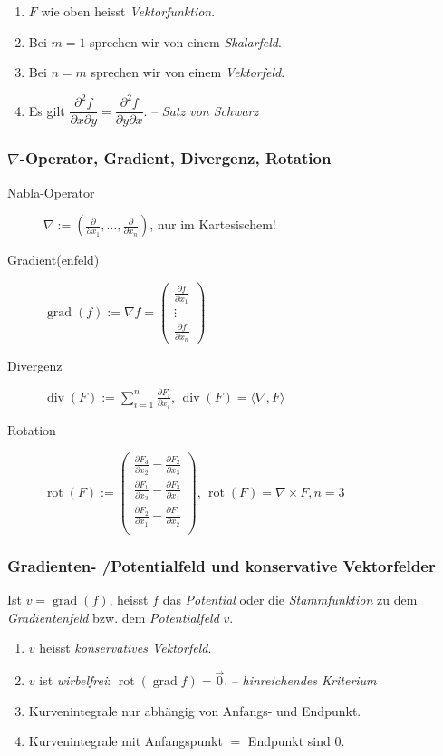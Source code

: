 \documentclass[a4paper, 9pt, DIV=24]{scrartcl}
\DeclareMathOperator{\grad}{grad}
\DeclareMathOperator{\rot}{rot}
\DeclareMathOperator{\Div}{div}
\begin{document}
\begin{enumerate}[label={(}\arabic*{)}]
 \item $F$ wie oben heisst \emph{Vektorfunktion}.
 \item Bei $m = 1$ sprechen wir von einem \emph{Skalarfeld}.
 \item Bei $n = m$ sprechen wir von einem \emph{Vektorfeld}.
 \item Es gilt $\dfrac{\partial^2 f}{\partial x\partial y} = \dfrac{\partial^2 f}{\partial y\partial x}$. -- \emph{Satz von Schwarz}
\end{enumerate}

\subsubsection{$\nabla$-Operator, Gradient, Divergenz, Rotation}
\begin{description}
 \item[Nabla-Operator] $\nabla := (\frac{\partial}{\partial x_1},\dots,\frac{\partial}{\partial x_n})$, nur im Kartesischem!
 \item[Gradient(enfeld)] $\grad(f) := \nabla f = \begin{pmatrix}\frac{\partial f}{\partial x_1} \\\vdots\\ \frac{\partial f}{\partial x_n}\end{pmatrix}$
 \item[Divergenz] $\Div(F) := \sum_{i=1}^n\frac{\partial F_i}{\partial x_i},\, \Div(F) = \langle \nabla, F \rangle$
 \item[Rotation] $\rot(F) := \begin{pmatrix}
\frac{\partial F_3}{\partial x_2} - \frac{\partial F_2}{\partial x_3} \\
\frac{\partial F_1}{\partial x_3} - \frac{\partial F_3}{\partial x_1} \\
\frac{\partial F_2}{\partial x_1} - \frac{\partial F_1}{\partial x_2} \\
\end{pmatrix},\, \rot(F) = \nabla \times F, n = 3$
\end{description}

\subsubsection{Gradienten- /Potentialfeld und konservative Vektorfelder}
Ist $v = \grad(f)$, heisst $f$ das \emph{Potential} oder die \emph{Stammfunktion} zu dem \emph{Gradientenfeld} bzw. dem \emph{Potentialfeld} $v$.
\begin{enumerate}[label={(}\arabic*{)}]
 \item $v$ heisst \emph{konservatives Vektorfeld}.
 \item $v$ ist \emph{wirbelfrei}: $\rot(\grad f) = \vec{0}$. -- \emph{hinreichendes Kriterium}
 \item Kurvenintegrale nur abhängig von Anfangs- und Endpunkt.
 \item Kurvenintegrale mit Anfangspunkt $=$ Endpunkt sind $0$.
\end{enumerate}
\end{document}
